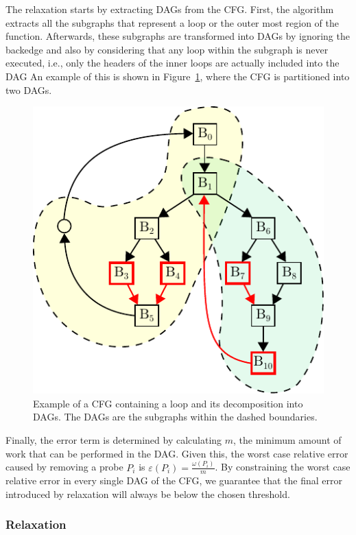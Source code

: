 The \WCRelaxLower relaxation starts by extracting DAGs from the CFG.
First, the algorithm extracts all the subgraphs that represent a loop or the outer most region of the function.
Afterwards, these subgraphs are transformed into DAGs by ignoring the backedge and also by considering that any loop within the subgraph is never executed, i.e., only the headers of the inner loops are actually included into the DAG
An example of this is shown in Figure~\ref{fig:cfg-relax-example}, where the CFG is partitioned into two DAGs.

\begin{figure}[t]
  \centering
  \includegraphics[scale=0.75]{figs/cfg-relax-example.pdf}
  \caption{Example of a CFG containing a loop and its decomposition into DAGs.
           The DAGs are the subgraphs within the dashed boundaries.}
  \label{fig:cfg-relax-example}
\end{figure}

Finally, the error term is determined by calculating $m$, the minimum amount of work that can be performed in the
DAG. Given this, the worst case relative error caused by removing a probe $P_i$ is $\varepsilon(P_i) = \frac{\omega(P_i)}{m}$. 
By constraining the worst case
relative error in every single DAG of the CFG, we guarantee that the final error introduced by relaxation will always be below the chosen
threshold.


\subsubsection{\WPRelaxTitle Relaxation}

